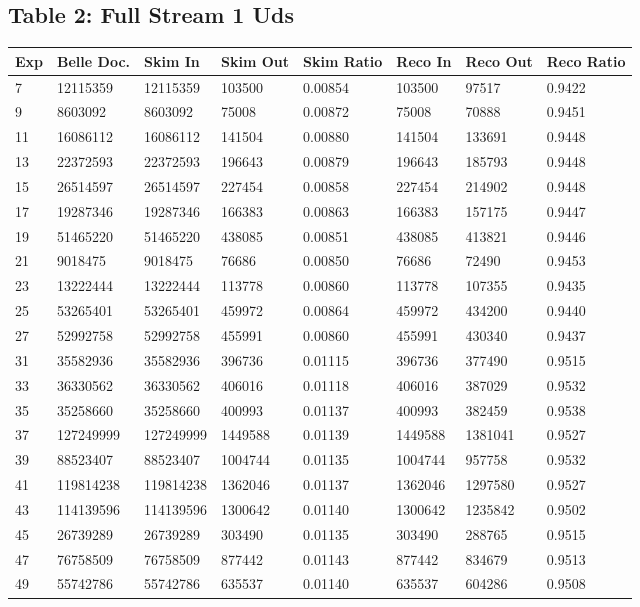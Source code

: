 \documentclass[11pt]{article}
\begin{document}
\subsection{Table 2: Full Stream 1 Uds}
\begin{tabular}{ | l || l | l | l | l || l | l | l |}
  \hline
  Exp&Belle Doc. &Skim In&Skim Out&Skim Ratio&Reco In&Reco Out&Reco Ratio \\
  \hline \hline
  7&12115359&12115359&103500&0.00854&103500&97517&0.9422\\\hline
  9&8603092&8603092&75008&0.00872&75008&70888&0.9451\\\hline
  11&16086112&16086112&141504&0.00880&141504&133691&0.9448\\\hline
  13&22372593&22372593&196643&0.00879&196643&185793&0.9448\\\hline
  15&26514597&26514597&227454&0.00858&227454&214902&0.9448\\\hline
  17&19287346&19287346&166383&0.00863&166383&157175&0.9447\\\hline
  19&51465220&51465220&438085&0.00851&438085&413821&0.9446\\\hline
  21&9018475&9018475&76686&0.00850&76686&72490&0.9453\\\hline
  23&13222444&13222444&113778&0.00860&113778&107355&0.9435\\\hline
  25&53265401&53265401&459972&0.00864&459972&434200&0.9440\\\hline
  27&52992758&52992758&455991&0.00860&455991&430340&0.9437\\\hline
  \hline
  31&35582936&35582936&396736&0.01115&396736&377490&0.9515\\\hline
  33&36330562&36330562&406016&0.01118&406016&387029&0.9532\\\hline
  35&35258660&35258660&400993&0.01137&400993&382459&0.9538\\\hline
  37&127249999&127249999&1449588&0.01139&1449588&1381041&0.9527\\\hline
  39&88523407&88523407&1004744&0.01135&1004744&957758&0.9532\\\hline
  41&119814238&119814238&1362046&0.01137&1362046&1297580&0.9527\\\hline
  43&114139596&114139596&1300642&0.01140&1300642&1235842&0.9502\\\hline
  45&26739289&26739289&303490&0.01135&303490&288765&0.9515\\\hline
  47&76758509&76758509&877442&0.01143&877442&834679&0.9513\\\hline
  49&55742786&55742786&635537&0.01140&635537&604286&0.9508\\\hline

\end{tabular}
\end{document}
